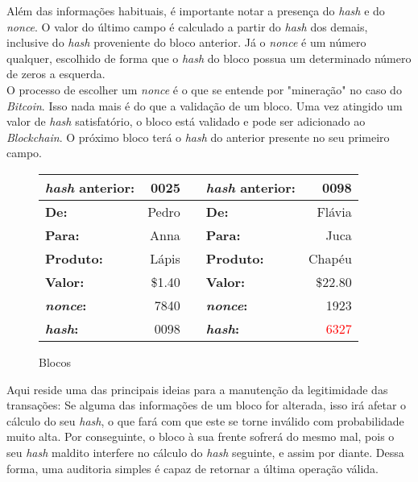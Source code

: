\documentclass[12pt]{article}
\begin{document}
	Além das informações habituais, é importante notar a presença do \textit{hash} e do \textit{nonce}. O valor do último campo é calculado a partir do \textit{hash} dos demais, inclusive do \textit{hash} proveniente do bloco anterior. Já o \textit{nonce} é um número qualquer, escolhido de forma que o \textit{hash} do bloco possua um determinado número de zeros a esquerda.\\
	
	O processo de escolher um \textit{nonce} é o que se entende por "mineração" no caso do \textit{Bitcoin}. Isso nada mais é do que a validação de um bloco. Uma vez atingido um valor de \textit{hash} satisfatório, o bloco está validado e pode ser adicionado ao \textit{Blockchain}. O próximo bloco terá o \textit{hash} do anterior presente no seu primeiro campo.\\
	
	\begin{figure}[H]
		\centering
		\begin{tabular}{|lr|c|lr|}
		\hline
		\textbf{\textit{hash} anterior:} & 0025 &\hspace*{1cm}& \textbf{\textit{hash} anterior:} & 0098\\
		\hline
		\textbf{De:} & Pedro & & \textbf{De:} & Flávia \\
		\hline
		\textbf{Para:} & Anna & & \textbf{Para:} & Juca \\
		\hline
		\textbf{Produto:} & Lápis & & \textbf{Produto:} & Chapéu \\
		\hline	
		\textbf{Valor:} & \$1.40 & & \textbf{Valor:} & \$22.80\\
		\hline
		\textbf{\textit{nonce}:} & 7840 & & \textbf{\textit{nonce}:} & 1923 \\
		\hline
		\textbf{\textit{hash}:} & 0098 & & \textbf{\textit{hash}:} & \textcolor{red}{6327} \\
		\hline
		\end{tabular}
		\label{fig:blockchain2}
		\caption{Blocos}
	\end{figure}	
	
	Aqui reside uma das principais ideias para a manutenção da legitimidade das transações: Se alguma das informações de um bloco for alterada, isso irá afetar o cálculo do seu \textit{hash}, o que fará com que este se torne inválido com probabilidade muito alta. Por conseguinte, o bloco à sua frente sofrerá do mesmo mal, pois o seu \textit{hash} maldito interfere no cálculo do \textit{hash} seguinte, e assim por diante. Dessa forma, uma auditoria simples é capaz de retornar a última operação válida.
	
\end{document}
